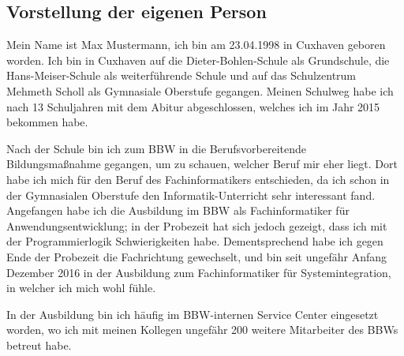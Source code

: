 \subsection{Vorstellung der eigenen Person} 
\label{sec:eigene Person}
Mein Name ist Max Mustermann, ich bin am 23.04.1998 in Cuxhaven geboren worden. Ich bin in Cuxhaven auf die Dieter-Bohlen-Schule als Grundschule, die Hans-Meiser-Schule als weiterführende Schule und auf das Schulzentrum Mehmeth Scholl als Gymnasiale Oberstufe gegangen. Meinen Schulweg habe ich nach 13 Schuljahren mit dem Abitur abgeschlossen, welches ich im Jahr 2015 bekommen habe. 

Nach der Schule bin ich zum \ac{BBW} in die Berufsvorbereitende Bildungsmaßnahme gegangen, um zu schauen, welcher Beruf mir eher liegt. Dort habe ich mich für den Beruf des Fachinformatikers entschieden, da ich schon in der Gymnasialen Oberstufe den Informatik-Unterricht sehr interessant fand. Angefangen habe ich die Ausbildung im \ac{BBW} als Fachinformatiker für Anwendungsentwicklung; in der Probezeit hat sich jedoch gezeigt, dass ich mit der Programmierlogik Schwierigkeiten habe. Dementsprechend habe ich gegen Ende der Probezeit die Fachrichtung gewechselt, und bin seit ungefähr Anfang Dezember 2016 in der Ausbildung zum Fachinformatiker für Systemintegration, in welcher ich mich wohl fühle. 

In der Ausbildung bin ich häufig im \ac{BBW}-internen Service Center eingesetzt worden, wo ich mit meinen Kollegen ungefähr 200 weitere Mitarbeiter des \ac{BBW}s betreut habe.